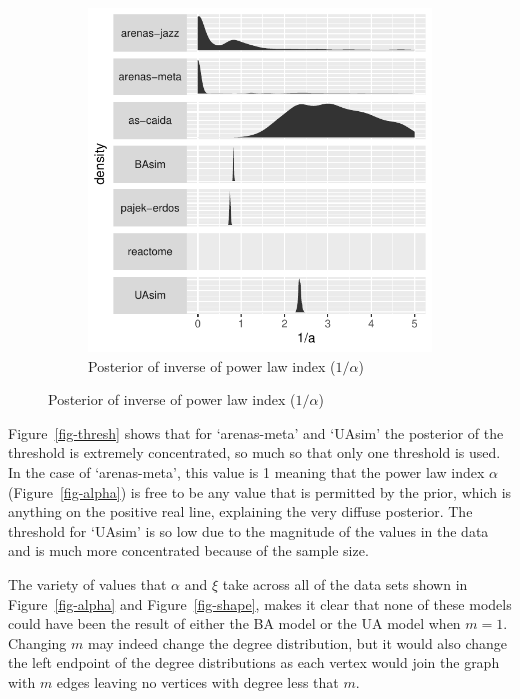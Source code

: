 \documentclass[
  10pt,
  a4paper,
]{scrreprt}
\theoremstyle{plain}
\theoremstyle{plain}
\theoremstyle{definition}
\theoremstyle{plain}
\theoremstyle{remark}
\begin{document}
{\begin{figure}
\begin{minipage}[t]{0.50\linewidth}
{\begin{figure}[H]
{\centering \includegraphics[width=1\textwidth,height=\textheight]{doc_files/figure-pdf/fig-alpha-inv-1.pdf}

}

\caption{\label{fig-alpha-inv}Posterior of inverse of power law index
(\(1/\alpha\))}

\end{figure}

}

\end{minipage}%

\end{figure}

Figure~\ref{fig-thresh} shows that for `arenas-meta' and `UAsim' the
posterior of the threshold is extremely concentrated, so much so that
only one threshold is used. In the case of `arenas-meta', this value is
1 meaning that the power law index \(\alpha\) (Figure~\ref{fig-alpha})
is free to be any value that is permitted by the prior, which is
anything on the positive real line, explaining the very diffuse
posterior. The threshold for `UAsim' is so low due to the magnitude of
the values in the data and is much more concentrated because of the
sample size.

The variety of values that \(\alpha\) and \(\xi\) take across all of the
data sets shown in Figure~\ref{fig-alpha} and Figure~\ref{fig-shape},
makes it clear that none of these models could have been the result of
either the BA model or the UA model when \(m=1\). Changing \(m\) may
indeed change the degree distribution, but it would also change the left
endpoint of the degree distributions as each vertex would join the graph
with \(m\) edges leaving no vertices with degree less that \(m\).

}
\end{document}
